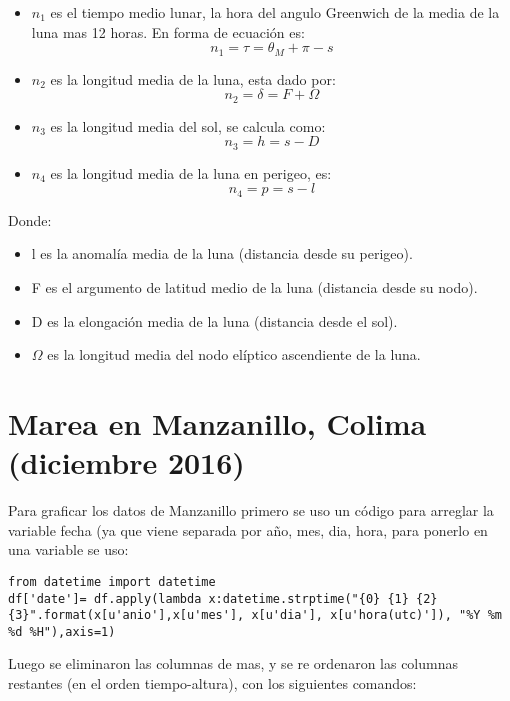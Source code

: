 \documentclass[12pt,letterpaper]{article}
\begin{document}
\begin{itemize}
\item $n_1$ es el tiempo medio lunar, la hora del angulo Greenwich de la media de la luna mas 12 horas. En forma de ecuación es:
\begin{equation}
n_{1} = \tau = \theta_{M} + \pi - s
\end{equation}
\item $n_2$ es la longitud media de la luna, esta dado por:
\begin{equation}
n_{2} = \delta = F + \Omega
\end{equation}
\item $n_3$ es la longitud media del sol, se calcula como: 
\begin{equation}
n_{3} = h = s-D
\end{equation}
\item $n_4$ es la longitud media de la luna en perigeo, es:
\begin{equation}
n_{4} = p = s - l
\end{equation}
\end{itemize}

Donde\cite{e}:
\begin{itemize}
\item l es la anomalía media de la luna (distancia desde su perigeo).
\item F es el argumento de latitud medio de la luna (distancia desde su nodo).
\item D es la elongación media de la luna (distancia desde el sol).
\item $\Omega$ es la longitud media del nodo elíptico ascendiente de la luna.
\end{itemize}



\section{Marea en Manzanillo, Colima (diciembre 2016)}

Para graficar los datos de Manzanillo primero se uso un código para arreglar la variable fecha (ya que viene separada por año, mes, dia, hora, para ponerlo en una variable se uso:
\begin{verbatim}
from datetime import datetime
df['date']= df.apply(lambda x:datetime.strptime("{0} {1} {2} {3}".format(x[u'anio'],x[u'mes'], x[u'dia'], x[u'hora(utc)']), "%Y %m %d %H"),axis=1)
\end{verbatim}

Luego se eliminaron las columnas de mas, y se re ordenaron las columnas restantes (en el orden tiempo-altura), con los siguientes comandos:
\end{document}
